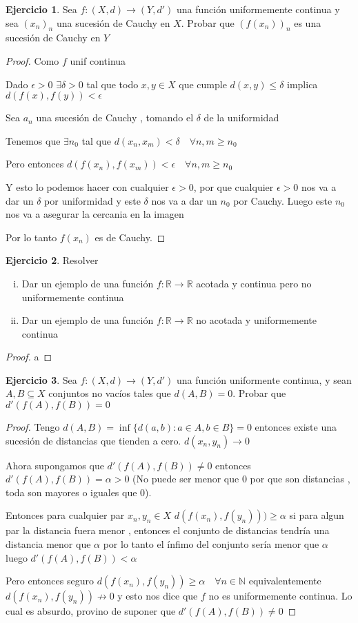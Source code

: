 \documentclass[12pt]{article}
\newcommand{\R}{\mathbb{R}}
\newcommand{\N}{\mathbb{N}}
\newcommand{\ra}{\rightarrow}
\theoremstyle{definition}
\newtheorem{ej}{Ejercicio}
\begin{document}
 \begin{ej}
 Sea $f: (X,d) \ra (Y,d')$ una función uniformemente continua y sea $(x_n)_n$ una sucesión de Cauchy en $X$. Probar que $(f(x_n))_n$ es una sucesión de Cauchy en $Y$
 \begin{proof}
   Como $f$ unif continua 

   Dado $\epsilon >0$  $\exists \delta >0$ tal que todo $x,y \in X$ que cumple $d(x,y) \leq \delta $ implica $d(f(x),f(y)) < \epsilon$

   Sea $a_n$ una sucesión de Cauchy , tomando el $\delta$ de la uniformidad 

   Tenemos que $\exists n_0$ tal que $d(x_n,x_m) < \delta \quad \forall n,m \geq n_0$

   Pero entonces $d(f(x_n),f(x_m)) < \epsilon \quad \forall n,m \geq n_0$

   Y esto lo podemos hacer con cualquier $\epsilon > 0$, por que cualquier $\epsilon > 0$ nos va a dar un $\delta$ por uniformidad y este $\delta$ nos va a dar un $n_0$ por Cauchy. Luego este $n_0$ nos va a asegurar la cercania en la imagen

   Por lo tanto $f(x_n)$ es de Cauchy.

 \end{proof}
 \end{ej}
 \begin{ej} Resolver
   \begin{enumerate}[i.]
     \item Dar un ejemplo de una función $f: \R \ra \R$ acotada y continua pero no uniformemente continua
     \item Dar un ejemplo de una función $f: \R \ra \R$ no acotada y uniformemente continua
   \end{enumerate}
   \begin{proof}
     a
   \end{proof}
 \end{ej}
 \begin{ej}
   Sea $f:(X,d) \ra (Y,d')$ una función uniformente continua, y sean $A,B \subseteq X$ conjuntos no vacíos tales que $d(A,B) = 0$. Probar que $d'(f(A),f(B)) = 0$ 
 \end{ej}
 \begin{proof}
   Tengo $d(A,B) = \inf \{d(a,b):a \in A , b \in B \} = 0$ entonces existe una sucesión de distancias que tienden a cero. $d(x_n,y_n) \ra 0$ 

   Ahora supongamos que $d'(f(A),f(B)) \neq 0$ entonces $ d'(f(A),f(B)) = \alpha > 0$ (No puede ser menor que 0 por que son distancias , toda son mayores o iguales que 0).

 Entonces para cualquier par $x_n,y_n \in X$ $d(f(x_n),f(y_n))) \geq \alpha$ si para algun par la distancia fuera menor , entonces el conjunto de distancias tendría una distancia menor que $\alpha$ por lo tanto el ínfimo del conjunto sería menor que $\alpha $ luego $d'(f(A),f(B)) < \alpha$

 Pero entonces seguro $d(f(x_n),f(y_n)) \geq \alpha \quad \forall n \in \N$ equivalentemente $d(f(x_n),f(y_n)) \not\ra 0$ y esto nos dice que $f$ no es uniformemente continua. Lo cual es absurdo, provino de suponer que $d'(f(A),f(B)) \neq 0$
\end{proof}
\end{document}
